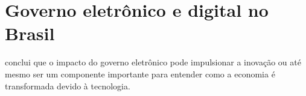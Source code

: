 \chapter{Governo eletrônico e digital no Brasil}

\cite{kotenok2020government} conclui que o impacto do governo eletrônico pode impulsionar a inovação ou até mesmo ser um componente importante para entender como a economia é transformada devido à tecnologia.
